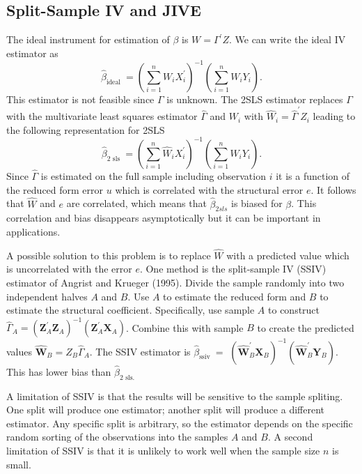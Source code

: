 \documentclass[10pt]{article}
\begin{document}
\subsection{Split-Sample IV and JIVE}
The ideal instrument for estimation of $\beta$ is $W=\Gamma^{\prime} Z$. We can write the ideal IV estimator as
$$
\widehat{\beta}_{\text {ideal }}=\left(\sum_{i=1}^{n} W_{i} X_{i}^{\prime}\right)^{-1}\left(\sum_{i=1}^{n} W_{i} Y_{i}\right) .
$$
This estimator is not feasible since $\Gamma$ is unknown. The 2SLS estimator replaces $\Gamma$ with the multivariate least squares estimator $\widehat{\Gamma}$ and $W_{i}$ with $\widehat{W}_{i}=\widehat{\Gamma}^{\prime} Z_{i}$ leading to the following representation for 2SLS
$$
\widehat{\beta}_{2 \text { sls }}=\left(\sum_{i=1}^{n} \widehat{W}_{i} X_{i}^{\prime}\right)^{-1}\left(\sum_{i=1}^{n} \widehat{W}_{i} Y_{i}\right) .
$$
Since $\widehat{\Gamma}$ is estimated on the full sample including observation $i$ it is a function of the reduced form error $u$ which is correlated with the structural error $e$. It follows that $\widehat{W}$ and $e$ are correlated, which means that $\widehat{\beta}_{2 s l s}$ is biased for $\beta$. This correlation and bias disappears asymptotically but it can be important in applications.

A possible solution to this problem is to replace $\widehat{W}$ with a predicted value which is uncorrelated with the error $e$. One method is the split-sample IV (SSIV) estimator of Angrist and Krueger (1995). Divide the sample randomly into two independent halves $A$ and $B$. Use $A$ to estimate the reduced form and $B$ to estimate the structural coefficient. Specifically, use sample $A$ to construct $\widehat{\Gamma}_{A}=\left(\boldsymbol{Z}_{A}^{\prime} \boldsymbol{Z}_{A}\right)^{-1}\left(\boldsymbol{Z}_{A}^{\prime} \boldsymbol{X}_{A}\right)$. Combine this with sample $B$ to create the predicted values $\widehat{\boldsymbol{W}}_{B}=Z_{B} \widehat{\Gamma}_{A}$. The SSIV estimator is $\widehat{\beta}_{\text {ssiv }}=$ $\left(\widehat{\boldsymbol{W}}_{B}^{\prime} \boldsymbol{X}_{B}\right)^{-1}\left(\widehat{\boldsymbol{W}}_{B}^{\prime} \boldsymbol{Y}_{B}\right)$. This has lower bias than $\widehat{\beta}_{2 \text { sls. }}$

A limitation of SSIV is that the results will be sensitive to the sample spliting. One split will produce one estimator; another split will produce a different estimator. Any specific split is arbitrary, so the estimator depends on the specific random sorting of the observations into the samples $A$ and $B$. A second limitation of SSIV is that it is unlikely to work well when the sample size $n$ is small.
\end{document}
